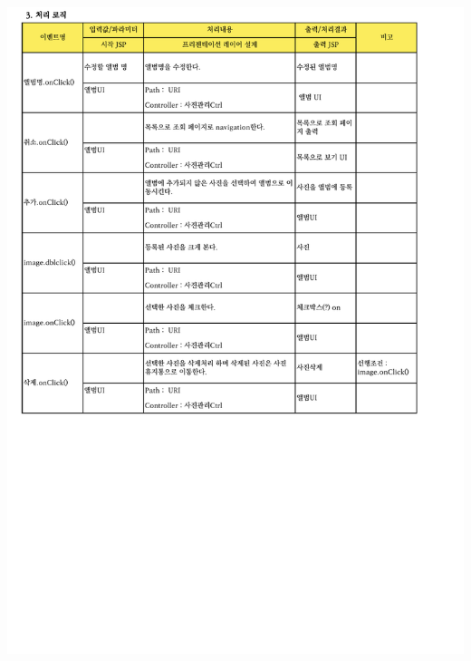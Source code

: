 {{{{{{{{{{{{{{{{{{{{{{{{{{{{{{{{{{{{{{{\includegraphics[width=20cm]{./Figure/Analysis/Display/photo/photo_06.pdf} \\
}}}}}}}}}}}}}}}}}}}}}}}}}}}}}}}}}}}}}}}
